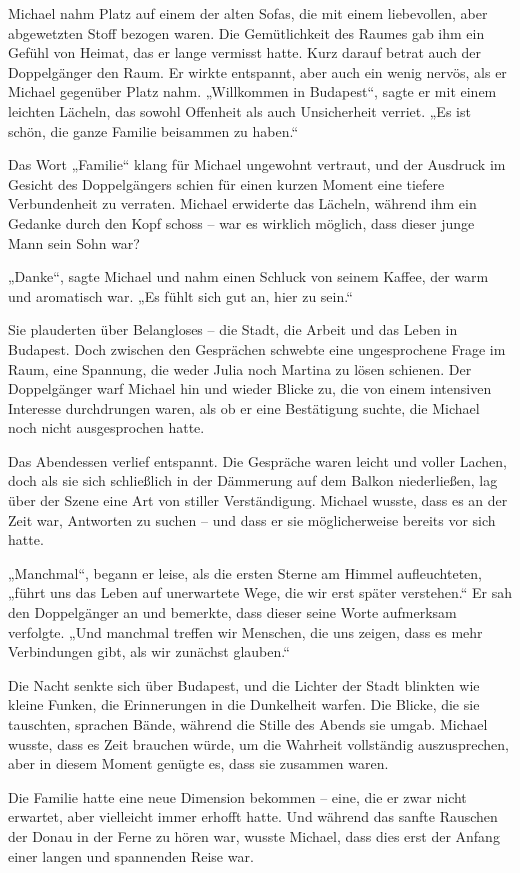\documentclass[
]{article}
\begin{document}
Michael nahm Platz auf einem der alten Sofas, die mit einem liebevollen,
aber abgewetzten Stoff bezogen waren. Die Gemütlichkeit des Raumes gab
ihm ein Gefühl von Heimat, das er lange vermisst hatte. Kurz darauf
betrat auch der Doppelgänger den Raum. Er wirkte entspannt, aber auch
ein wenig nervös, als er Michael gegenüber Platz nahm. „Willkommen in
Budapest``, sagte er mit einem leichten Lächeln, das sowohl Offenheit
als auch Unsicherheit verriet. „Es ist schön, die ganze
\textquotesingle Familie\textquotesingle{} beisammen zu haben.``

Das Wort „Familie`` klang für Michael ungewohnt vertraut, und der
Ausdruck im Gesicht des Doppelgängers schien für einen kurzen Moment
eine tiefere Verbundenheit zu verraten. Michael erwiderte das Lächeln,
während ihm ein Gedanke durch den Kopf schoss -- war es wirklich
möglich, dass dieser junge Mann sein Sohn war?

„Danke``, sagte Michael und nahm einen Schluck von seinem Kaffee, der
warm und aromatisch war. „Es fühlt sich gut an, hier zu sein.``

Sie plauderten über Belangloses -- die Stadt, die Arbeit und das Leben
in Budapest. Doch zwischen den Gesprächen schwebte eine ungesprochene
Frage im Raum, eine Spannung, die weder Julia noch Martina zu lösen
schienen. Der Doppelgänger warf Michael hin und wieder Blicke zu, die
von einem intensiven Interesse durchdrungen waren, als ob er eine
Bestätigung suchte, die Michael noch nicht ausgesprochen hatte.

Das Abendessen verlief entspannt. Die Gespräche waren leicht und voller
Lachen, doch als sie sich schließlich in der Dämmerung auf dem Balkon
niederließen, lag über der Szene eine Art von stiller Verständigung.
Michael wusste, dass es an der Zeit war, Antworten zu suchen -- und dass
er sie möglicherweise bereits vor sich hatte.

„Manchmal``, begann er leise, als die ersten Sterne am Himmel
aufleuchteten, „führt uns das Leben auf unerwartete Wege, die wir erst
später verstehen.`` Er sah den Doppelgänger an und bemerkte, dass dieser
seine Worte aufmerksam verfolgte. „Und manchmal treffen wir Menschen,
die uns zeigen, dass es mehr Verbindungen gibt, als wir zunächst
glauben.``

Die Nacht senkte sich über Budapest, und die Lichter der Stadt blinkten
wie kleine Funken, die Erinnerungen in die Dunkelheit warfen. Die
Blicke, die sie tauschten, sprachen Bände, während die Stille des Abends
sie umgab. Michael wusste, dass es Zeit brauchen würde, um die Wahrheit
vollständig auszusprechen, aber in diesem Moment genügte es, dass sie
zusammen waren.

Die Familie hatte eine neue Dimension bekommen -- eine, die er zwar
nicht erwartet, aber vielleicht immer erhofft hatte. Und während das
sanfte Rauschen der Donau in der Ferne zu hören war, wusste Michael,
dass dies erst der Anfang einer langen und spannenden Reise war.
\end{document}
